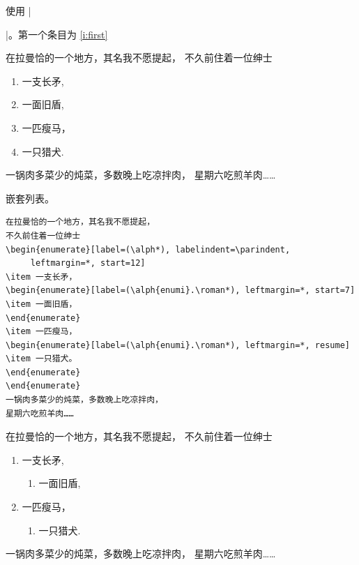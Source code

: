 \documentclass[a4paper]{ltxguide}
\begin{document}
\begin{enumerate}[leftmargin=*]
\begin{enumerate}[leftmargin=\parindent]
\begin{enumerate}[labelindent=\parindent,|\allowbreak
| leftmargin=*,|\allowbreak| label=\Roman*.,|\allowbreak
| widest=III,|\allowbreak| align=left]
\newsample

使用 |\begin{enumerate}[label=\fbox{\arabic*}]|。第一个条目为 \ref{i:first}

\samplesep

在拉曼恰的一个地方，其名我不愿提起，
不久前住着一位绅士
\begin{enumerate}[label=\fbox{\arabic*}]
\item \label{i:first}一支长矛,
\item 一面旧盾,
\item 一匹瘦马，
\item 一只猎犬.
\end{enumerate}
一锅肉多菜少的炖菜，多数晚上吃凉拌肉，
星期六吃煎羊肉……

\newsample

嵌套列表。

\samplesep

\begin{verbatim}
在拉曼恰的一个地方，其名我不愿提起，
不久前住着一位绅士
\begin{enumerate}[label=(\alph*), labelindent=\parindent,
     leftmargin=*, start=12]
\item 一支长矛，
\begin{enumerate}[label=(\alph{enumi}.\roman*), leftmargin=*, start=7]
\item 一面旧盾，
\end{enumerate}
\item 一匹瘦马，
\begin{enumerate}[label=(\alph{enumi}.\roman*), leftmargin=*, resume]
\item 一只猎犬。
\end{enumerate}
\end{enumerate}
一锅肉多菜少的炖菜，多数晚上吃凉拌肉，
星期六吃煎羊肉……
\end{verbatim}

在拉曼恰的一个地方，其名我不愿提起，
不久前住着一位绅士
\begin{enumerate}[label=(\alph*), labelindent=\parindent,
     leftmargin=*, start=12]
\item 一支长矛,
\begin{enumerate}[label=(\alph{enumi}.\roman*), leftmargin=*, start=7]
\item 一面旧盾,
\end{enumerate}
\item 一匹瘦马，
\begin{enumerate}[label=(\alph{enumi}.\roman*), leftmargin=*, resume]
\item 一只猎犬.
\end{enumerate}
\end{enumerate}
一锅肉多菜少的炖菜，多数晚上吃凉拌肉，
星期六吃煎羊肉……


\end{enumerate}
\end{enumerate}
\end{enumerate}
\end{enumerate}
\end{document}
